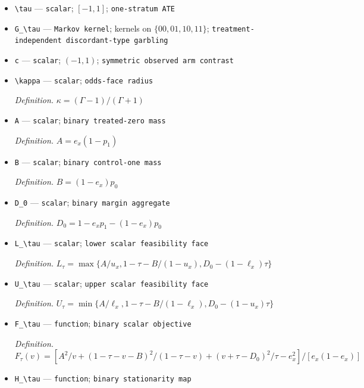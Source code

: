 \documentclass{article}
\begin{document}
\begin{itemize}
  \item \texttt{\textbackslash{}\allowbreak{}tau} --- \texttt{scalar}; \([-1,1]\); \texttt{one-\allowbreak{}stratum ATE}
  \item \texttt{G\_\allowbreak{}\textbackslash{}\allowbreak{}tau} --- \texttt{Markov kernel}; kernels on \(\{00,01,10,11\}\); \texttt{treatment-\allowbreak{}independent discordant-\allowbreak{}type garbling}
  \item \texttt{c} --- \texttt{scalar}; \((-1,1)\); \texttt{symmetric observed arm contrast}
  \item \texttt{\textbackslash{}\allowbreak{}kappa} --- \texttt{scalar}; \texttt{odds-\allowbreak{}face radius}
  \par\smallskip\noindent\emph{Definition.} \(\kappa=(\Gamma-1)/(\Gamma+1)\)
  \item \texttt{A} --- \texttt{scalar}; \texttt{binary treated-\allowbreak{}zero mass}
  \par\smallskip\noindent\emph{Definition.} \(A=e_x(1-p_1)\)
  \item \texttt{B} --- \texttt{scalar}; \texttt{binary control-\allowbreak{}one mass}
  \par\smallskip\noindent\emph{Definition.} \(B=(1-e_x)p_0\)
  \item \texttt{D\_\allowbreak{}0} --- \texttt{scalar}; \texttt{binary margin aggregate}
  \par\smallskip\noindent\emph{Definition.} \(D_0=1-e_xp_1-(1-e_x)p_0\)
  \item \texttt{L\_\allowbreak{}\textbackslash{}\allowbreak{}tau} --- \texttt{scalar}; \texttt{lower scalar feasibility face}
  \par\smallskip\noindent\emph{Definition.} \(L_\tau=\max\{A/u_x,1-\tau-B/(1-u_x),D_0-(1-\ell_x)\tau\}\)
  \item \texttt{U\_\allowbreak{}\textbackslash{}\allowbreak{}tau} --- \texttt{scalar}; \texttt{upper scalar feasibility face}
  \par\smallskip\noindent\emph{Definition.} \(U_\tau=\min\{A/\ell_x,1-\tau-B/(1-\ell_x),D_0-(1-u_x)\tau\}\)
  \item \texttt{F\_\allowbreak{}\textbackslash{}\allowbreak{}tau} --- \texttt{function}; \texttt{binary scalar objective}
  \par\smallskip\noindent\emph{Definition.} \(F_\tau(v)=[A^2/v+(1-\tau-v-B)^2/(1-\tau-v)+(v+\tau-D_0)^2/\tau-e_x^2]/[e_x(1-e_x)]\)
  \item \texttt{H\_\allowbreak{}\textbackslash{}\allowbreak{}tau} --- \texttt{function}; \texttt{binary stationarity map}

\end{itemize}
\end{document}
